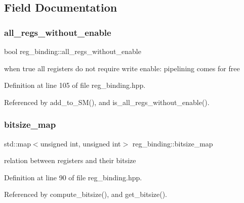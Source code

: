\subsection{Field Documentation}
\mbox{\label{classreg__binding_a1d7d423897ff0a25db54fb26ef9b76c9}} 
\subsubsection{\texorpdfstring{all\+\_\+regs\+\_\+without\+\_\+enable}{all\_regs\_without\_enable}}
{\footnotesize\ttfamily bool reg\+\_\+binding\+::all\+\_\+regs\+\_\+without\+\_\+enable\hspace{0.3cm}{\ttfamily [protected]}}



when true all registers do not require write enable\+: pipelining comes for free 



Definition at line 105 of file reg\+\_\+binding.\+hpp.



Referenced by add\+\_\+to\+\_\+\+S\+M(), and is\+\_\+all\+\_\+regs\+\_\+without\+\_\+enable().

\mbox{\label{classreg__binding_a849f9be37d56e16abe5386ee3f3a74b9}} 
\subsubsection{\texorpdfstring{bitsize\+\_\+map}{bitsize\_map}}
{\footnotesize\ttfamily std\+::map$<$unsigned int, unsigned int$>$ reg\+\_\+binding\+::bitsize\+\_\+map\hspace{0.3cm}{\ttfamily [protected]}}



relation between registers and their bitsize 



Definition at line 90 of file reg\+\_\+binding.\+hpp.



Referenced by compute\+\_\+bitsize(), and get\+\_\+bitsize().

